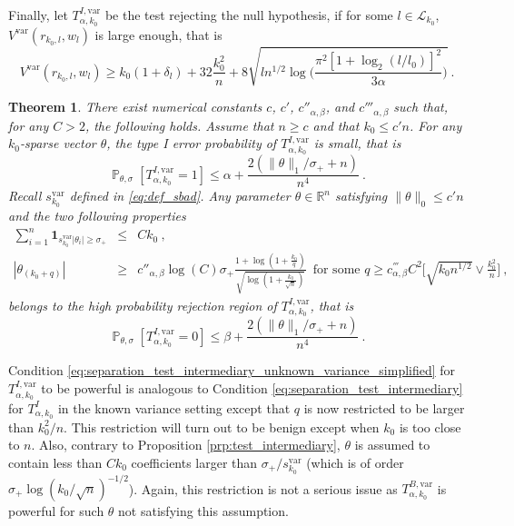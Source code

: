 \documentclass[twoside,11pt]{article}
\newtheorem{thm}{Theorem}
\def\beq{\begin{equation}}
\def\eeq{\end{equation}}
\def\cL{\mathcal{L}}
\renewcommand{\P}{\operatorname{\mathbb{P}}}
\newcommand{\<}{\langle}
\renewcommand{\>}{\rangle}
\begin{document}
Finally, let $T^{I,\mathrm{var}}_{\alpha,k_0}$  be the test  rejecting the null hypothesis, if for some $l \in \cL_{k_0}$, $  V^{\mathrm{var}}(r_{k_0,l},w_l) $ is large enough, that is 
\beq\label{eq:rejection_intermediary_unknown}
  V^{\mathrm{var}}(r_{k_0,l},w_l) \geq k_0(1+\delta_l) +32\frac{k_0^2}{n}+ 8\sqrt{ln^{1/2}\log\Big(\frac{\pi^2 [1+\log_2(l/l_0)]^2}{3\alpha}\Big)}\ .
\eeq




\begin{thm}\label{cor:stat_intermediaire_unknown_variance}
There exist numerical constants $c$, $c'$, $c''_{\alpha,\beta}$, and $c'''_{\alpha,\beta}$ such that, for any $C>2$, the following holds. Assume that $n\geq c$ and that $k_0\leq c'n$.
For any $k_0$-sparse vector $\theta$, the type I error probability of $T^{I,\mathrm{var}}_{\alpha,k_0}$ is small, that is 
\[
 \P_{\theta,\sigma}[T^{I,\mathrm{var}}_{\alpha,k_0}=1]\leq \alpha + \frac{2(\|\theta\|_1/\sigma_++ n)}{n^4}\ . 
\]
Recall $s_{k_0}^{\mathrm{var}}$ defined in \eqref{eq:def_sbad}. Any parameter $\theta\in \mathbb{R}^n$ satisfying $\|\theta\|_0\leq c'n$ and the two following properties  
\begin{eqnarray}
 \label{eq:separation_test_intermediary_unknown_variance_simplified2}
\sum_{i=1}^n\mathbf{1}_{s_{k_0}^{\mathrm{var}}|\theta_i|\geq \sigma_+}&\leq& C k_0\ , \\
\label{eq:separation_test_intermediary_unknown_variance_simplified}
|\theta_{(k_0+q)}|&\geq& c''_{\alpha,\beta}\log(C)\sigma_+\frac{1+ \log(1+ \frac{k_0}{q})}{\sqrt{\log(1+ \frac{k_0}{\sqrt{n}})}}  \, \text{ for some } q\geq c^{'''}_{\alpha,\beta} C^2 \big[\sqrt{k_0n^{1/2}}\vee \frac{k_0^2}{n}\big]\ ,
\end{eqnarray}
belongs to the high probability rejection region of $T^{I,\mathrm{var}}_{\alpha,k_0}$, that is 
\[
\P_{\theta,\sigma}[T^{I,\mathrm{var}}_{\alpha,k_0}=0]\leq \beta+   \frac{2(\|\theta\|_1/\sigma_++ n)}{n^4} \ .
\]
\end{thm}

Condition \eqref{eq:separation_test_intermediary_unknown_variance_simplified} for $T^{I,\mathrm{var}}_{\alpha,k_0}$ to be powerful is analogous to Condition \eqref{eq:separation_test_intermediary} for $T^{I}_{\alpha,k_0}$ in the known variance setting except that $q$ is now restricted to be larger than $k_0^2/n$. This restriction will turn out to be benign except when $k_0$ is  too close to $n$. Also, contrary to Proposition \ref{prp:test_intermediary}, $\theta$ is assumed to contain less than $Ck_0$ coefficients larger than $\sigma_+/s_{k_0}^{\mathrm{var}}$ (which is of order $\sigma_+\log(k_0/\sqrt{n})^{-1/2}$). Again, this restriction is not a serious issue as $T^{B,\mathrm{var}}_{\alpha,k_0}$ is powerful for such $\theta$ not satisfying this assumption.
\end{document}
